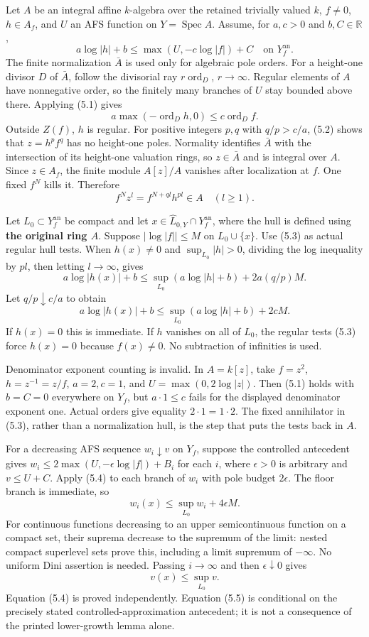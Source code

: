 \documentclass[
  10pt,
]{article}
\begin{document}
Let \(A\) be an integral affine \(k\)-algebra over the retained
trivially valued \(k\), \(f\ne0\), \(h\in A_f\), and \(U\) an AFS
function on \(Y=\operatorname{Spec}A\). Assume, for \(a,c>0\) and
\(b,C\in\mathbb R\),
\[a\log|h|+b\le\max(U,-c\log|f|)+C\quad\text{on }Y_f^{\mathrm{an}}. \tag{5.1}\]
The finite normalization \(\bar A\) is used only for algebraic pole
orders. For a height-one divisor \(D\) of \(\bar A\), follow the
divisorial ray \(r\operatorname{ord}_D\), \(r\to\infty\). Regular
elements of \(A\) have nonnegative order, so the finitely many branches
of \(U\) stay bounded above there. Applying (5.1) gives
\[a\max(-\operatorname{ord}_Dh,0)\le c\operatorname{ord}_Df. \tag{5.2}\]
Outside \(Z(f)\), \(h\) is regular. For positive integers \(p,q\) with
\(q/p>c/a\), (5.2) shows that \(z=h^pf^q\) has no height-one poles.
Normality identifies \(\bar A\) with the intersection of its height-one
valuation rings, so \(z\in\bar A\) and is integral over \(A\). Since
\(z\in A_f\), the finite module \(A[z]/A\) vanishes after localization
at \(f\). One fixed \(f^N\) kills it. Therefore
\[f^Nz^l=f^{N+ql}h^{pl}\in A\quad(l\ge1). \tag{5.3}\]

Let \(L_0\subset Y_f^{\mathrm{an}}\) be compact and let
\(x\in\widehat L_{0,Y}\cap Y_f^{\mathrm{an}}\), where the hull is
defined using \textbf{the original ring \(A\)}. Suppose
\(|\log|f||\le M\) on \(L_0\cup\{x\}\). Use (5.3) as actual regular hull
tests. When \(h(x)\ne0\) and \(\sup_{L_0}|h|>0\), dividing the log
inequality by \(pl\), then letting \(l\to\infty\), gives
\[a\log|h(x)|+b\le\sup_{L_0}(a\log|h|+b)+2a(q/p)M.\] Let
\(q/p\downarrow c/a\) to obtain
\[a\log|h(x)|+b\le\sup_{L_0}(a\log|h|+b)+2cM. \tag{5.4}\] If \(h(x)=0\)
this is immediate. If \(h\) vanishes on all of \(L_0\), the regular
tests (5.3) force \(h(x)=0\) because \(f(x)\ne0\). No subtraction of
infinities is used.

Denominator exponent counting is invalid. In \(A=k[z]\), take \(f=z^2\),
\(h=z^{-1}=z/f\), \(a=2,c=1\), and \(U=\max(0,2\log|z|)\). Then (5.1)
holds with \(b=C=0\) everywhere on \(Y_f\), but \(a\cdot1\le c\) fails
for the displayed denominator exponent one. Actual orders give equality
\(2\cdot1=1\cdot2\). The fixed annihilator in (5.3), rather than a
normalization hull, is the step that puts the tests back in \(A\).

For a decreasing AFS sequence \(w_i\downarrow v\) on \(Y_f\), suppose
the controlled antecedent gives \(w_i\le2\max(U,-\epsilon\log|f|)+B_i\)
for each \(i\), where \(\epsilon>0\) is arbitrary and \(v\le U+C\).
Apply (5.4) to each branch of \(w_i\) with pole budget \(2\epsilon\).
The floor branch is immediate, so
\[w_i(x)\le\sup_{L_0}w_i+4\epsilon M.\] For continuous functions
decreasing to an upper semicontinuous function on a compact set, their
suprema decrease to the supremum of the limit: nested compact superlevel
sets prove this, including a limit supremum of \(-\infty\). No uniform
Dini assertion is needed. Passing \(i\to\infty\) and then
\(\epsilon\downarrow0\) gives \[v(x)\le\sup_{L_0}v. \tag{5.5}\] Equation
(5.4) is proved independently. Equation (5.5) is conditional on the
precisely stated controlled-approximation antecedent; it is not a
consequence of the printed lower-growth lemma alone.
\end{document}
